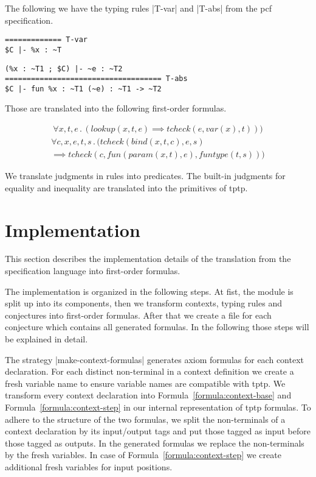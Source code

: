 \begin{example}
  The following we have the typing rules \code|T-var| and \code|T-abs|
  from the \gls{pcf} specification.

\begin{minipage}{.30\linewidth}
\begin{lstlisting}[language=sltc]
%x : ~T in $C
============= T-var
$C |- %x : ~T
\end{lstlisting}
\end{minipage}
\begin{minipage}{.64\linewidth}
\begin{lstlisting}[language=sltc]
(%x : ~T1 ; $C) |- ~e : ~T2
==================================== T-abs
$C |- fun %x : ~T1 (~e) : ~T1 -> ~T2
\end{lstlisting}
\end{minipage}

Those are translated into the following first-order formulas.

\begin{multline}
  \forall x, t, e \,.\, (lookup(x, t, e) \implies tcheck(e, var(x), t)))
\end{multline}
\begin{multline}
  \forall c, x, e, t, s \,.\, (tcheck(bind(x, t, c), e, s) \\ \implies
  tcheck(c, fun(param(x, t), e), funtype(t, s)))
\end{multline}
\end{example}

We translate judgments in rules into predicates. The built-in
judgments for equality and inequality are translated into the
primitives of \gls{tptp}.
\section{Implementation}
\label{sec:implementation-fof}
This section describes the implementation details of the translation
from the specification language into first-order formulas.

The implementation is organized in the following steps. At fist, the
module is split up into its components, then we transform contexts,
typing rules and conjectures into first-order formulas. After that we
create a file for each conjecture which contains all generated
formulas. In the following those steps will be explained in detail.

The strategy \code|make-context-formulas| generates axiom formulas for
each context declaration. For each distinct non-terminal in a context
definition we create a fresh variable name to ensure variable names
are compatible with \gls{tptp}. We transform every context declaration
into Formula~\ref{formula:context-base} and
Formula~\ref{formula:context-step} in our internal representation of
\gls{tptp} formulas. To adhere to the structure of the two formulas,
we split the non-terminals of a context declaration by its
input/output tags and put those tagged as input before those tagged as
outputs. In the generated formulas we replace the non-terminals by the
fresh variables. In case of Formula~\ref{formula:context-step} we
create additional fresh variables for input positions.

